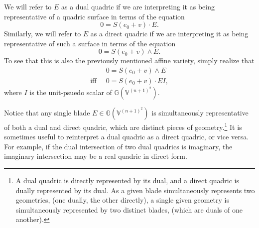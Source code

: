 \documentclass{birkjour}
\theoremstyle{definition}
\theoremstyle{remark}
\numberwithin{equation}{section}
\newcommand{\G}{\mathbb{G}}
\newcommand{\V}{\mathbb{V}}
\begin{document}
We will refer to $E$ as a dual quadric if we are interpreting it as being representative
of a quadric surface in terms of the equation
\begin{equation}\label{equ_dual_quadric}
0 = S(e_0+v)\cdot E.
\end{equation}
Similarly, we will refer to $E$ as a direct quadric if we are interpreting it as being
representative of such a surface in terms of the equation
\begin{equation}\label{equ_direct_quadric}
0 = S(e_0+v)\wedge E.
\end{equation}
To see that this is also the previously mentioned affine variety, simply realize that
\begin{align}
 & 0 = S(e_0+v)\wedge E \\
\mbox{iff}\;\; & 0 = S(e_0+v)\cdot EI,
\end{align}
where $I$ is the unit-psuedo scalar of $\G(\V^{(n+1)^2})$.

Notice that any single blade $E\in\G(\V^{(n+1)^2})$ is
simultaneously representative of both a dual and direct quadric, which are distinct
pieces of geometry.\footnote{A dual quadric is directly represented by its dual, and
a direct quadric is dually represented by its dual.  As a given blade simultaneously
represents two geometries, (one dually, the other directly), a single given geometry is
simultaneously represented by two distinct blades, (which are duals of one another).}
It is sometimes useful to reinterpret a dual quadric
as a direct quadric, or vice versa.  For example, if the dual intersection of
two dual quadrics is imaginary, the imaginary intersection may be a real quadric
in direct form.

\end{document}
